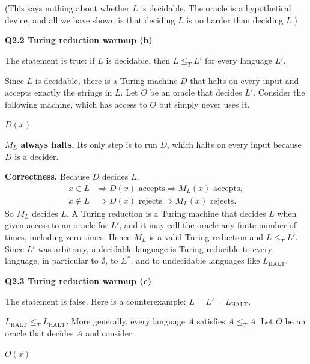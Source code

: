 \documentclass[11pt]{article}
\newcommand{\lT}{\leq_T}
\newcommand{\Lh}{L_{\text{HALT}}}
\newcommand{\qpage}[1]{\clearpage\noindent\textbf{\large #1}\par\medskip}
\begin{document}
(This says nothing about whether $L$ is decidable.
The oracle is a hypothetical device, and all we have shown is that deciding $L$ is no harder than deciding $\overline{L}$.)

\qpage{Q2.2 Turing reduction warmup (b)}

The statement is true: if $L$ is decidable, then $L \lT L'$ for every language $L'$.

Since $L$ is decidable, there is a Turing machine $D$ that halts on every input and accepts exactly the strings in $L$.
Let $O$ be an oracle that decides $L'$.
Consider the following machine, which has access to $O$ but simply never uses it.

\begin{algorithmic}[1]
    \State \Return $D(x)$ 
  \EndFunction
\end{algorithmic}

\textbf{$M_L$ always halts.}
Its only step is to run $D$, which halts on every input because $D$ is a decider.

\textbf{Correctness.}
Because $D$ decides $L$,
\begin{align*}
  x \in L &\Longrightarrow D(x) \text{ accepts} \Longrightarrow M_L(x) \text{ accepts}, \\
  x \notin L &\Longrightarrow D(x) \text{ rejects} \Longrightarrow M_L(x) \text{ rejects}.
\end{align*}
So $M_L$ decides $L$.
A Turing reduction is a Turing machine that decides $L$ when given access to an oracle for $L'$, and it may call the oracle any finite number of times, including zero times.
Hence $M_L$ is a valid Turing reduction and $L \lT L'$.
Since $L'$ was arbitrary, a decidable language is Turing-reducible to every language, in particular to $\emptyset$, to $\Sigma^*$, and to undecidable languages like $\Lh$.

\qpage{Q2.3 Turing reduction warmup (c)}

The statement is false.
Here is a counterexample: $L = L' = \Lh$.

\textbf{$\Lh \lT \Lh$.}
More generally, every language $A$ satisfies $A \lT A$.
Let $O$ be an oracle that decides $A$ and consider

\begin{algorithmic}[1]
    \State \Return $O(x)$
  \EndFunction
\end{algorithmic}
\end{document}
